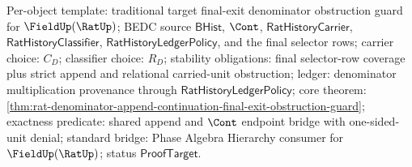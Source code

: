 Per-object template: traditional target final-exit denominator obstruction
guard for $\FieldUp(\RatUp)$; BEDC source $\mathsf{BHist}$, $\Cont$,
$\mathsf{RatHistoryCarrier}$, $\mathsf{RatHistoryClassifier}$,
$\mathsf{RatHistoryLedgerPolicy}$, and the final selector rows; carrier choice:
$C_D$; classifier choice: $R_D$; stability obligations: final selector-row
coverage plus strict append and relational carried-unit obstruction; ledger:
denominator multiplication provenance through
$\mathsf{RatHistoryLedgerPolicy}$; core theorem:
\autoref{thm:rat-denominator-append-continuation-final-exit-obstruction-guard};
exactness predicate: shared append and $\Cont$ endpoint bridge with
one-sided-unit denial; standard bridge: Phase Algebra Hierarchy consumer for
$\FieldUp(\RatUp)$; status $\mathsf{ProofTarget}$.
